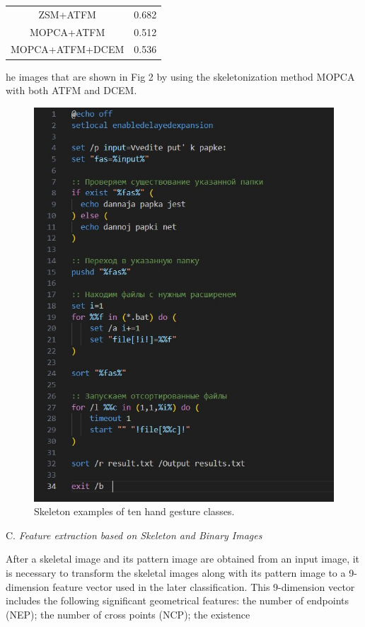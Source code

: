 \documentclass[10pt, a4paper]{article}
\begin{document}
\begin{multicols}{2}
\begin{table}[H]
\begin{center}
\begin{tabular}{|c|c|}
ZSM+ATFM & 0.682 \\
MOPCA+ATFM & 0.512 \\
MOPCA+ATFM+DCEM & 0.536\\
\hline
\end{tabular}
\end{center}
\end{table} 
he images that are shown in Fig 2 by using the skeletonization method MOPCA with both ATFM and DCEM.
\begin{figure}[H]
    \centering
    \includegraphics[width=0.87\linewidth]{image.png}
    \caption{ \small { Skeleton examples of ten hand gesture classes.}}
    \label{fig:enter-label}
\end{figure}
C. \textit{Feature extraction based on Skeleton and Binary
Images}\\
\par
 After a skeletal image and its pattern image are obtained from an input image, it is necessary to transform
the skeletal images along with its pattern image to a
9-dimension feature vector used in the later classification. This 9-dimension vector includes the following
significant geometrical features: the number of endpoints
(NEP); the number of cross points (NCP); the existence

\end{multicols}
\end{document}
